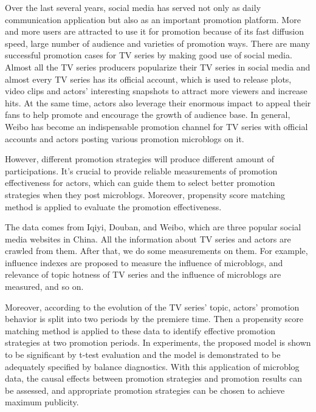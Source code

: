 
\begin{eabstract}

Over the last several years, social media has served not only as daily communication application but also as an important promotion platform. More and more users are attracted to use it for promotion because of its fast diffusion speed, large number of audience and varieties of promotion ways. There are many successful promotion cases for TV series by making good use of social media. Almost all the TV series producers popularize their TV series in social media and almost every TV series has its official account, which is used to release plots, video clips and actors’ interesting snapshots to attract more viewers and increase hits. At the same time, actors also leverage their enormous impact to appeal their fans to help promote and encourage the growth of audience base. In general, Weibo has become an indispensable promotion channel for TV series with official accounts and actors posting various promotion microblogs on it.

However, different promotion strategies will produce different amount of participations. It's crucial to provide reliable measurements of promotion effectiveness for actors, which can guide them to select better promotion strategies when they post microblogs. Moreover, propensity score matching method is applied to evaluate the promotion effectiveness. 

The data comes from Iqiyi, Douban, and Weibo, which are three popular social media websites in China. All the information about TV series and actors are crawled from them. After that, we do some measurements on them. For example, influence indexes are proposed to measure the influence of microblogs, and relevance of topic hotness of TV series and the influence of microblogs are measured, and so on. 

Moreover, according to the evolution of the TV series’ topic, actors’ promotion behavior is split into two periods by the premiere time. Then a propensity score matching method is applied to these data to identify effective promotion strategies at two promotion periods. In experiments, the proposed model is shown to be significant by t-test evaluation and the model is demonstrated to be adequately specified by balance diagnostics. With this application of microblog data, the causal effects between promotion strategies and promotion results can be assessed, and appropriate promotion strategies can be chosen to achieve maximum publicity.


\end{eabstract}




































